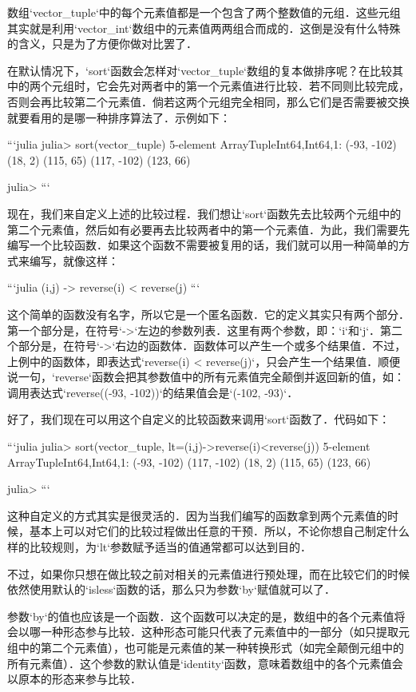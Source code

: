 数组`vector_tuple`中的每个元素值都是一个包含了两个整数值的元组．这些元组其实就是利用`vector_int`数组中的元素值两两组合而成的．这倒是没有什么特殊的含义，只是为了方便你做对比罢了．

在默认情况下，`sort`函数会怎样对`vector_tuple`数组的复本做排序呢？在比较其中的两个元组时，它会先对两者中的第一个元素值进行比较．若不同则比较完成，否则会再比较第二个元素值．倘若这两个元组完全相同，那么它们是否需要被交换就要看用的是哪一种排序算法了．示例如下：

```julia
julia> sort(vector_tuple)
5-element Array{Tuple{Int64,Int64},1}:
 (-93, -102)
 (18, 2)    
 (115, 65)  
 (117, -102)
 (123, 66)  

julia> 
```

现在，我们来自定义上述的比较过程．我们想让`sort`函数先去比较两个元组中的第二个元素值，然后如有必要再去比较两者中的第一个元素值．为此，我们需要先编写一个比较函数．如果这个函数不需要被复用的话，我们就可以用一种简单的方式来编写，就像这样：

```julia
(i,j) -> reverse(i) < reverse(j)
```

这个简单的函数没有名字，所以它是一个匿名函数．它的定义其实只有两个部分．第一个部分是，在符号`->`左边的参数列表．这里有两个参数，即：`i`和`j`．第二个部分是，在符号`->`右边的函数体．函数体可以产生一个或多个结果值．不过，上例中的函数体，即表达式`reverse(i) < reverse(j)`，只会产生一个结果值．顺便说一句，`reverse`函数会把其参数值中的所有元素值完全颠倒并返回新的值，如：调用表达式`reverse((-93, -102))`的结果值会是`(-102, -93)`．

好了，我们现在可以用这个自定义的比较函数来调用`sort`函数了．代码如下：

```julia
julia> sort(vector_tuple, lt=(i,j)->reverse(i)<reverse(j))
5-element Array{Tuple{Int64,Int64},1}:
 (-93, -102)
 (117, -102)
 (18, 2)    
 (115, 65)  
 (123, 66)  

julia> 
```

这种自定义的方式其实是很灵活的．因为当我们编写的函数拿到两个元素值的时候，基本上可以对它们的比较过程做出任意的干预．所以，不论你想自己制定什么样的比较规则，为`lt`参数赋予适当的值通常都可以达到目的．

不过，如果你只想在做比较之前对相关的元素值进行预处理，而在比较它们的时候依然使用默认的`isless`函数的话，那么只为参数`by`赋值就可以了．

参数`by`的值也应该是一个函数．这个函数可以决定的是，数组中的各个元素值将会以哪一种形态参与比较．这种形态可能只代表了元素值中的一部分（如只提取元组中的第二个元素值），也可能是元素值的某一种转换形式（如完全颠倒元组中的所有元素值）．这个参数的默认值是`identity`函数，意味着数组中的各个元素值会以原本的形态来参与比较．

